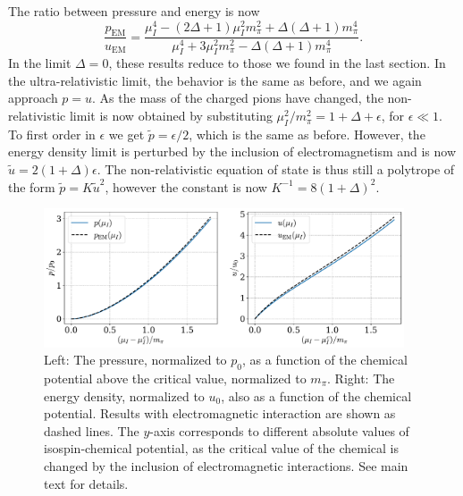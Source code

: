 %
The ratio between pressure and energy is now
%
\begin{equation}
    \frac{p_\text{EM}}{u_\text{EM}} 
    = 
    \frac{
        {\mu_I^4} - (2\Delta + 1) {\mu_I^2}{m_\pi^2} + \Delta(\Delta + 1)m_\pi^4
        }{
        {\mu_I^4} + 3 {\mu_I^2}{m_\pi^2} - \Delta (\Delta +1) m_\pi^4
        }.
\end{equation}
%
In the limit $\Delta = 0$, these results reduce to those we found in the last section.
In the ultra-relativistic limit, the behavior is the same as before, and we again approach $p = u$.
As the mass of the charged pions have changed, the non-relativistic limit is now obtained by substituting ${\mu_I^2}/{m_\pi^2} = 1 + \Delta + \epsilon$, for $\epsilon \ll 1$.
To first order in $\epsilon$ we get $\tilde p = \epsilon / 2$, which is the same as before.
However, the energy density limit is perturbed by the inclusion of electromagnetism and is now $\tilde u = 2(1 + \Delta) \epsilon$.
The non-relativistic equation of state is thus still a polytrope of the form $\tilde p = K \tilde u^2$, however the constant is now $K^{-1} = 8 (1+\Delta)^2$.


\begin{figure}[!htb]
    \centering
    \includegraphics[width=0.95\textwidth]{../scripts/figurer/pion_star/pion_up.pdf}
    \caption{
        Left: The pressure, normalized to $p_0$, as a function of the chemical potential above the critical value, normalized to $m_\pi$.
        Right: The energy density, normalized to $u_0$, also as a function of the chemical potential.
        Results with electromagnetic interaction are shown as dashed lines.
        The $y$-axis corresponds to different absolute values of isospin-chemical potential, as the critical value of the chemical is changed by the inclusion of electromagnetic interactions. See main text for details.
        }
        \label{fig: pressure and energy with EM interaction}
\end{figure}




